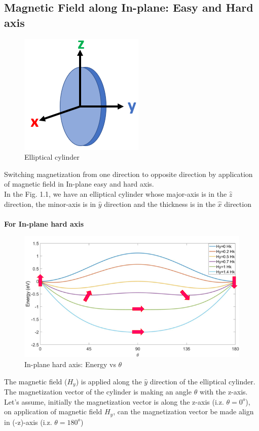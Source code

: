 \documentclass[12pt,a4paper,bold]{thesis}
\theoremstyle{thm}
\theoremstyle{definition}
\begin{document}
\subsection{Magnetic Field along In-plane: Easy and Hard axis}
\begin{figure}[H]
	\centering
   \includegraphics[scale=0.56]{Images/19.png} 
   \caption{Elliptical cylinder}
\end{figure} 
Switching magnetization from one direction to opposite direction by application of magnetic field in In-plane easy and hard axis. \\
In the Fig. 1.1, we have an elliptical cylinder whose major-axis is in the $\hat{z}$ direction, the minor-axis is in $\hat{y}$ direction and the thickness is in the $\hat{x}$ direction\\\\

\textbf{For In-plane hard axis}\\
\begin{figure}[H]
	\centering
   \includegraphics[scale=0.56]{Images/20.png} 
   \caption{In-plane hard axis: Energy vs $\theta$}
\end{figure}
The magnetic field (\textbf{$H_y$}) is applied along the $\hat{y}$ direction of the elliptical cylinder. The magnetization vector of the cylinder is making an angle $\theta$ with the z-axis. Let's assume, initially the magnetization vector is along the z-axis (i.z. $\theta=0^o$), on application of magnetic field $H_y$, can the magnetization vector be made align in (-z)-axis (i.z. $\theta=180^o$)
\end{document}
